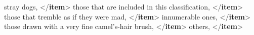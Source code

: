 \documentclass[11pt,twoside]{article}\makeatletter
\begin{document}
\begin{shaded}
\hspace*{1em} stray\mbox{}\newline 
\hspace*{1em}\hspace*{1em}\hspace*{1em}\hspace*{1em} dogs, {</\textbf{item}>}\mbox{}\newline 
\hspace*{1em} those that are included in this\mbox{}\newline 
\hspace*{1em}\hspace*{1em}\hspace*{1em}\hspace*{1em} classification, {</\textbf{item}>}\mbox{}\newline 
\hspace*{1em} those that tremble as if they\mbox{}\newline 
\hspace*{1em}\hspace*{1em}\hspace*{1em}\hspace*{1em} were mad, {</\textbf{item}>}\mbox{}\newline 
\hspace*{1em} innumerable ones, {</\textbf{item}>}\mbox{}\newline 
\hspace*{1em} those\mbox{}\newline 
\hspace*{1em}\hspace*{1em}\hspace*{1em}\hspace*{1em} drawn with a very fine camel's-hair brush, {</\textbf{item}>}\mbox{}\newline 
\hspace*{1em}others, {</\textbf{item}>}\mbox{}\newline 

\end{shaded}
\end{document}

